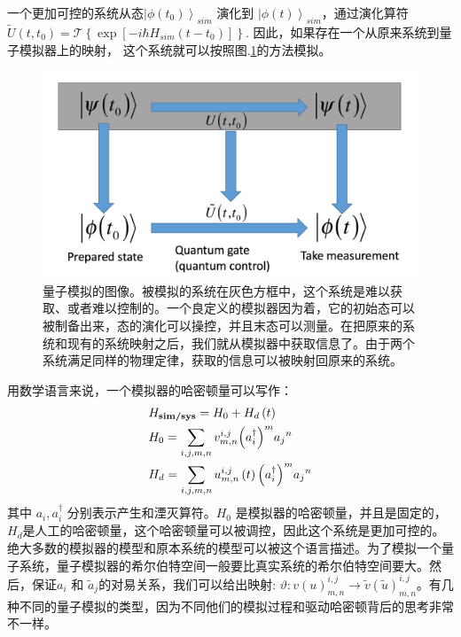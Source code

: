 \documentclass[supercite]{HustGraduPaper}
\begin{document}
一个更加可控的系统从态${\left| {\phi \left( t_0 \right)} \right\rangle _{sim}}$ 演化到 ${\left| {\phi \left( t \right)} \right\rangle _{sim}}$，通过演化算符 
   $\tilde U\left( {t,{t_0}} \right) = \mathcal{T}\left\{ {\exp \left[ { - i\hbar {H_{sim}}\left( {t - t_0} \right)} \right]} \right\}$. 因此，如果存在一个从原来系统到量子模拟器上的映射，
   这个系统就可以按照图.\ref{fig:quantumsimu}的方法模拟\cite{Georgescu2014}。

\begin{figure}
	\centering
	\includegraphics[width=1\linewidth]{Figures/mine/1}
	\caption{量子模拟的图像。被模拟的系统在灰色方框中，这个系统是难以获取、或者难以控制的。一个良定义的模拟器因为着，它的初始态可以被制备出来，态的演化可以操控，并且末态可以测量。在把原来的系统和现有的系统映射之后，我们就从模拟器中获取信息了。由于两个系统满足同样的物理定律，获取的信息可以被映射回原来的系统。}
	\label{fig:quantumsimu}
\end{figure}
   
   用数学语言来说，一个模拟器的哈密顿量可以写作：
      \begin{equation}
   \begin{gathered}
   {H_{\textbf{sim/sys}}} = {H_0} + {H_d}\left( t \right) \hfill \\
   {H_0} = \sum\limits_{i,j,m,n} {v_{m,n}^{i,j}{{\left( {a_i^\dag } \right)}^m}{a_j}^n}  \hfill \\
   {H_d} = \sum\limits_{i,j,m,n} {u_{m,n}^{i,j}\left( t \right){{\left( {a_i^\dag } \right)}^m}{a_j}^n}  \hfill \\ 
   \end{gathered} 
   \end{equation}
   其中 $a_i,a_i^{\dagger}$ 分别表示产生和湮灭算符。$H_0$ 是模拟器的哈密顿量，并且是固定的，$H_d$是人工的哈密顿量，这个哈密顿量可以被调控，因此这个系统是更加可控的\cite{Georgescu2014}。绝大多数的模拟器的模型和原本系统的模型可以被这个语言描述。为了模拟一个量子系统，量子模拟器的希尔伯特空间一般要比真实系统的希尔伯特空间要大。然后，保证$a_i$ 和 $\tilde{a}_j$的对易关系，我们可以给出映射: $\vartheta :v\left( u \right)_{m,n}^{i,j} \to \tilde v\left( {\tilde u} \right)_{m,n}^{i,j}$。有几种不同的量子模拟的类型，因为不同他们的模拟过程和驱动哈密顿背后的思考非常不一样\cite{Georgescu2014}。
   
\end{document}
